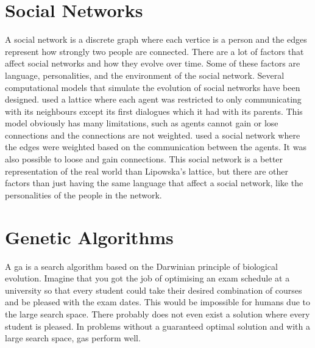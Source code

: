 \section{Social Networks}
A social network is a discrete graph where each vertice is a person and the edges represent how strongly two people are connected. There are a lot of factors that affect social networks and how they evolve over time. Some of these factors are language, personalities, and the environment of the social network. Several computational models that simulate the evolution of social networks have been designed. \citet{lipowska2011naming} used a lattice where each agent was restricted to only communicating with its neighbours except its first dialogues which it had with its parents. This model obviously has many limitations, such as agents cannot gain or lose connections and the connections are not weighted. 
\citet{lekvam2014co} used a social network where the edges were weighted based on the communication between the agents. It was also possible to loose and gain connections. This social network is a better representation of the real world than Lipowska's lattice, but there are other factors than just having the same language that affect a social network, like the personalities of the people in the network.



\section{Genetic Algorithms} \label{GAalgorithm}
A \ac{ga} is a search algorithm based on the Darwinian principle of biological evolution. Imagine that you got the job of optimising an exam schedule at a university so that every student could take their desired combination of courses and be pleased with the exam dates. This would be impossible for humans due to the large search space. There probably does not even exist a solution where every student is pleased. In problems without a guaranteed optimal solution and with a large search space, \acp{ga} perform well.

